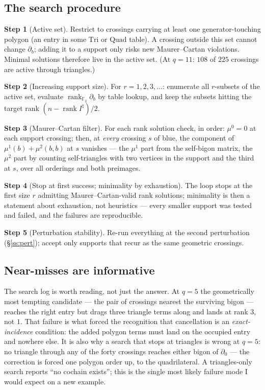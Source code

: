 \documentclass[11pt,reqno]{amsart}
\theoremstyle{plain}
\theoremstyle{definition}
\newtheorem{step}{Step}
\newcommand{\F}{\mathbb{F}}
\newcommand{\Inat}{I^{\natural}}
\newcommand{\rk}{\operatorname{rank}}
\newcommand{\bc}{b}
\begin{document}
\subsection{The search procedure}
\begin{step}[Active set]
Restrict to crossings carrying at least one generator-touching polygon (an entry in some
$\mathrm{Tri}$ or $\mathrm{Quad}$ table). A crossing outside this set cannot change
$\partial_\bc$; adding it to a support only risks new Maurer--Cartan violations. Minimal
solutions therefore live in the active set. (At $q=11$: $108$ of $225$ crossings are active
through triangles.)
\end{step}
\begin{step}[Increasing support size]
For $r=1,2,3,\dots$: enumerate all $r$-subsets of the active set, evaluate
$\rk_{\F_2}\partial_\bc$ by table lookup, and keep the subsets hitting the target rank
$(n-\rk\Inat)/2$.
\end{step}
\begin{step}[Maurer--Cartan filter]
For each rank solution check, in order: $\mu^0=0$ at each support crossing; then, at
\emph{every} crossing $s$ of blue, the component of $\mu^1(\bc)+\mu^2(\bc,\bc)$ at $s$
vanishes --- the $\mu^1$ part from the self-bigon matrix, the $\mu^2$ part by counting
self-triangles with two vertices in the support and the third at $s$, over all orderings and
both preimages.
\end{step}
\begin{step}[Stop at first success; minimality by exhaustion]
The loop stops at the first size $r$ admitting Maurer--Cartan-valid rank solutions; minimality
is then a statement about exhaustion, not heuristics --- every smaller support was tested and
failed, and the failures are reproducible.
\end{step}
\begin{step}[Perturbation stability]
Re-run everything at the second perturbation (\S\ref{ss:pert}); accept only supports that
recur as the same geometric crossings.
\end{step}

\subsection{Near-misses are informative}
The search log is worth reading, not just the answer. At $q=5$ the geometrically most tempting
candidate --- the pair of crossings nearest the surviving bigon --- reaches the right entry but
drags three triangle terms along and lands at rank $3$, not $1$. That failure is what forced
the recognition that cancellation is an \emph{exact-incidence} condition: the added polygon
terms must land on the occupied entry and nowhere else. It is also why a search that stops at
triangles is wrong at $q=5$: no triangle through any of the forty crossings reaches either
bigon of $\partial_0$ --- the correction is forced one polygon order up, to the quadrilateral.
A triangles-only search reports ``no cochain exists''; this is the single most likely failure
mode I would expect on a new example.
\end{document}
